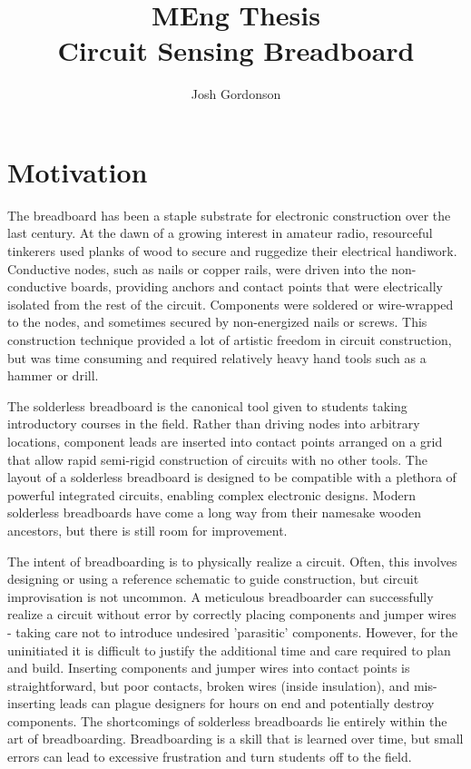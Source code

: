 \documentclass[11pt, a4paper]{article}
\title{MEng Thesis \\ Circuit Sensing Breadboard}
\author{Josh Gordonson}
\begin{document}
\maketitle

\section{Motivation}
The breadboard has been a staple substrate for electronic construction over the last century.
At the dawn of a growing interest in amateur radio, resourceful tinkerers used planks of wood to secure and ruggedize their electrical handiwork.
Conductive nodes, such as nails or copper rails, were driven into the non-conductive boards, providing anchors and contact points that were electrically isolated from the rest of the circuit.
Components were soldered or wire-wrapped to the nodes, and sometimes secured by non-energized nails or screws.
This construction technique provided a lot of artistic freedom in circuit construction, but was time consuming and required relatively heavy hand tools such as a hammer or drill.

The solderless breadboard is the canonical tool given to students taking introductory courses in the field.
Rather than driving nodes into arbitrary locations, component leads are inserted into contact points arranged on a grid that allow rapid semi-rigid construction of circuits with no other tools.
The layout of a solderless breadboard is designed to be compatible with a plethora of powerful integrated circuits, enabling complex electronic designs.
Modern solderless breadboards have come a long way from their namesake wooden ancestors, but there is still room for improvement.

The intent of breadboarding is to physically realize a circuit.
Often, this involves designing or using a reference schematic to guide construction, but circuit improvisation is not uncommon.  
A meticulous breadboarder can successfully realize a circuit without error by correctly placing components and jumper wires - taking care not to introduce undesired 'parasitic' components.  
However, for the uninitiated it is difficult to justify the additional time and care required to plan and build.
Inserting components and jumper wires into contact points is straightforward, but poor contacts, broken wires (inside insulation), and mis-inserting leads can plague designers for hours on end and potentially destroy components.
The shortcomings of solderless breadboards lie entirely within the art of breadboarding.
Breadboarding is a skill that is learned over time, but small errors can lead to excessive frustration and turn students off to the field.
\end{document}

